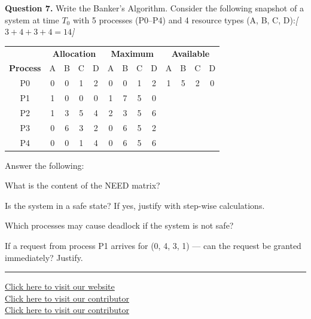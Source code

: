 \documentclass[11pt,a4paper]{article}
\newcommand{\pts}[1]{\hfill   \textit{[#1]}}
\begin{document}
\bigskip




\noindent   \textbf{Question 7.} Write the Banker's Algorithm. Consider the following snapshot of a system at time $T_0$ with 5 processes (P0--P4) and 4 resource types (A, B, C, D):\pts{$3+4+3+4=14$}


\begin{center}

\begin{tabular}{|c|cccc|cccc|cccc|}
\hline
& \multicolumn{4}{c|}{   \textbf{Allocation}} & \multicolumn{4}{c|}{   \textbf{Maximum}} & \multicolumn{4}{c|}{   \textbf{Available}} \\
   \textbf{Process} & A & B & C & D & A & B & C & D & A & B & C & D \\
\hline
P0 & 0 & 0 & 1 & 2 & 0 & 0 & 1 & 2 & 1 & 5 & 2 & 0 \\
P1 & 1 & 0 & 0 & 0 & 1 & 7 & 5 & 0 &   &   &   &   \\
P2 & 1 & 3 & 5 & 4 & 2 & 3 & 5 & 6 &   &   &   &   \\
P3 & 0 & 6 & 3 & 2 & 0 & 6 & 5 & 2 &   &   &   &   \\
P4 & 0 & 0 & 1 & 4 & 0 & 6 & 5 & 6 &   &   &   &   \\
\hline
\end{tabular}
\end{center}

Answer the following:

\begin{parts}
  \item What is the content of the NEED matrix?
  \item Is the system in a safe state? If yes, justify with step-wise calculations.
  \item Which processes may cause deadlock if the system is not safe?
  \item If a request from process P1 arrives for (0, 4, 3, 1) --- can the request be granted immediately? Justify.
\end{parts}

\vfill
\rule{\linewidth}{0.4pt}

\begin{center}\small
\href{https://bhu-exam.vercel.app/}{Click here to visit our website}\\[4pt]\href{https://me-aryan.vercel.app/}{Click here to visit our contributor}\\[4pt]\href{https://quashan-me.vercel.app/}{Click here to visit our contributor}
\end{center}
\end{document}
